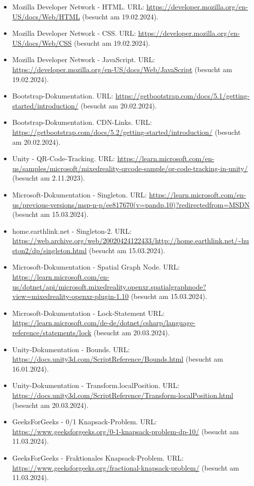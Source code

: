 \begin{itemize}
    \item Mozilla Developer Network - HTML. URL: \url{https://developer.mozilla.org/en-US/docs/Web/HTML} (besucht am 19.02.2024).
    \item Mozilla Developer Network - CSS. URL: \url{https://developer.mozilla.org/en-US/docs/Web/CSS} (besucht am 19.02.2024).
    \item Mozilla Developer Network - JavaScript. URL: \url{https://developer.mozilla.org/en-US/docs/Web/JavaScript} (besucht am 19.02.2024).
    \item Bootstrap-Dokumentation. URL: \url{https://getbootstrap.com/docs/5.1/getting-started/introduction/} (besucht am 20.02.2024).
    \item Bootstrap-Dokumentation. CDN-Links. URL: \url{https://getbootstrap.com/docs/5.2/getting-started/introduction/} (besucht am 20.02.2024).
    \item Unity - QR-Code-Tracking. URL: \url{https://learn.microsoft.com/en-us/samples/microsoft/mixedreality-qrcode-sample/qr-code-tracking-in-unity/} (besucht am 2.11.2023).
    \item Microsoft-Dokumentation - Singleton. URL: \url{https://learn.microsoft.com/en-us/previous-versions/msp-n-p/ee817670(v=pandp.10)?redirectedfrom=MSDN} (besucht am 15.03.2024).
    \item home.earthlink.net - Singleton-2. URL: \url{https://web.archive.org/web/20020424122433/http://home.earthlink.net/~huston2/dp/singleton.html} (besucht am 15.03.2024).
    \item Microsoft-Dokumentation - Spatial Graph Node. URL: \url{https://learn.microsoft.com/en-us/dotnet/api/microsoft.mixedreality.openxr.spatialgraphnode?view=mixedreality-openxr-plugin-1.10} (besucht am 15.03.2024).
    \item Microsoft-Dokumentation - Lock-Statement URL: \url{https://learn.microsoft.com/de-de/dotnet/csharp/language-reference/statements/lock} (besucht am 20.03.2024).
    \item Unity-Dokumentation - Bounds. URL: \url{https://docs.unity3d.com/ScriptReference/Bounds.html} (besucht am 16.01.2024).
    \item Unity-Dokumentation - Transform.localPosition. URL: \url{https://docs.unity3d.com/ScriptReference/Transform-localPosition.html} (besucht am 20.03.2024).
    \item GeeksForGeeks - 0/1 Knapsack-Problem. URL: \url{https://www.geeksforgeeks.org/0-1-knapsack-problem-dp-10/} (besucht am 11.03.2024).
    \item GeeksForGeeks - Fraktionales Knapsack-Problem. URL: \url{https://www.geeksforgeeks.org/fractional-knapsack-problem/} (besucht am 11.03.2024).

\end{itemize}
